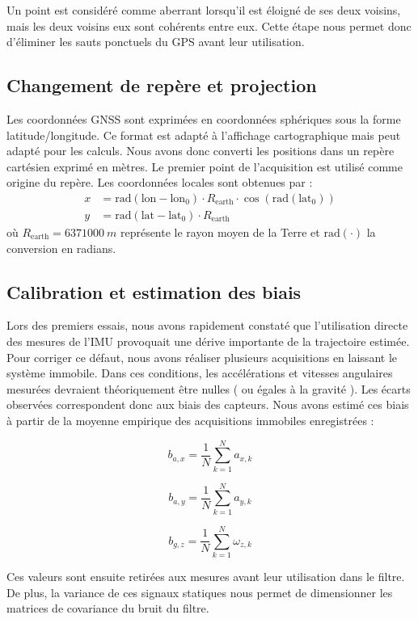 \documentclass{article}
\begin{document}
Un point est considéré comme aberrant lorsqu'il est éloigné de ses deux voisins, mais les deux voisins eux sont cohérents entre eux. Cette étape nous permet donc d'éliminer les sauts ponctuels du GPS avant leur utilisation.

\subsection{Changement de repère et projection}
Les coordonnées GNSS sont exprimées en coordonnées sphériques sous la forme latitude/longitude. Ce format est adapté à l'affichage cartographique mais peut adapté pour les calculs. Nous avons donc converti les positions dans un repère cartésien exprimé en mètres. Le premier point de l'acquisition est utilisé comme origine du repère.  Les coordonnées locales sont obtenues par : 
\[
\begin{aligned}
x &= \text{rad}(\text{lon}-\text{lon}_0) \cdot R_{\text{earth}} \cdot \cos(\text{rad}(\text{lat}_0)) \\
y &= \text{rad}(\text{lat}-\text{lat}_0) \cdot R_{\text{earth}}
\end{aligned}
\]
où $R_{\text{earth}} = \SI{6371000}{m}$ représente le rayon moyen de la Terre et $\text{rad}(\cdot)$ la conversion en radians.

\subsection{Calibration et estimation des biais}

Lors des premiers essais, nous avons rapidement constaté que l'utilisation directe des mesures de l'IMU provoquait une dérive importante de la trajectoire estimée. Pour corriger ce défaut, nous avons réaliser plusieurs acquisitions en laissant le système immobile. Dans ces conditions, les accélérations et vitesses angulaires mesurées devraient théoriquement être nulles ( ou égales à la gravité ). Les écarts observées correspondent donc aux biais des capteurs. Nous avons estimé ces biais à partir de la moyenne empirique des acquisitions immobiles enregistrées : 

\[
b_{a,x}=\frac1N\sum_{k=1}^{N}a_{x,k}
\]

\[
b_{a,y}=\frac1N\sum_{k=1}^{N}a_{y,k}
\]

\[
b_{g,z}=\frac1N\sum_{k=1}^{N}\omega_{z,k}
\]

Ces valeurs sont ensuite retirées aux mesures avant leur utilisation dans le filtre. De plus, la variance de ces signaux statiques nous permet de dimensionner les matrices de covariance du bruit du filtre.
\end{document}
